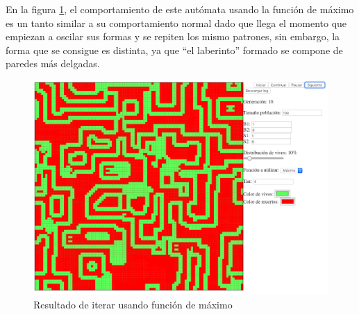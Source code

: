 	En la figura \ref{fig:golm16}, el comportamiento de este autómata usando la función de máximo es un tanto similar a su comportamiento normal dado que llega el momento que empiezan a oscilar sus formas y se repiten los mismo patrones, sin embargo, la forma que se consigue es distinta, ya que ``el laberinto'' formado se compone de paredes más delgadas.
	\begin{figure}[H]
		\begin{center}
			\includegraphics[scale=.3]{GOLM/img/regla1616-1.png}
			\caption{Resultado de iterar usando función de máximo}
			\label{fig:golm16}
		\end{center}
	\end{figure}

